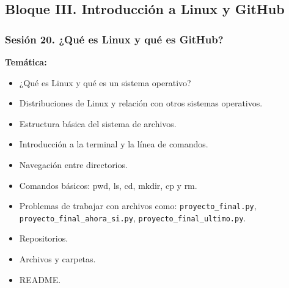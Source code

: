 \documentclass[12pt,letterpaper]{article}
\newcommand{\github}{\textit{GitHub}}
\begin{document}
\subsection{Bloque III. Introducción a Linux y GitHub}



\subsubsection*{Sesión 20. ¿Qué es Linux y qué es GitHub?}

\textbf{Temática:}
\begin{itemize}[noitemsep]
\item ¿Qué es Linux y qué es un sistema operativo?
\item Distribuciones de Linux y relación con otros sistemas operativos.
\item Estructura básica del sistema de archivos.
\item Introducción a la terminal y la línea de comandos.
\item Navegación entre directorios.
\item Comandos básicos: pwd, ls, cd, mkdir, cp y rm.

    \item Problemas de trabajar con archivos como:
    \texttt{proyecto\_final.py},
    \texttt{proyecto\_final\_ahora\_si.py},
    \texttt{proyecto\_final\_ultimo.py}.
     \item Repositorios.
    \item Archivos y carpetas.
    \item README.
\end{itemize}
\end{document}
